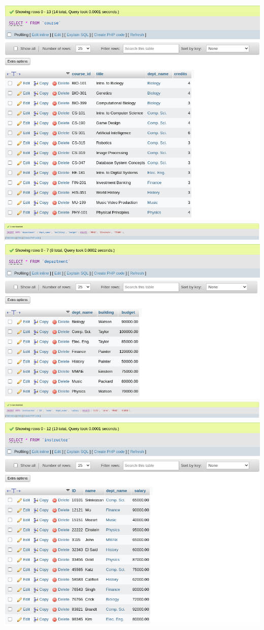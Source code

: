 \documentclass{article}
\begin{document}
\begin{center}
    \includegraphics[scale=0.5]{7-3s.png}
    \newpage
    \includegraphics[scale=0.5]{7-4i.png}
    \includegraphics[scale=0.5]{7-4s.png}
    \newpage
    \includegraphics[scale=0.5]{7-5i.png}
    \includegraphics[scale=0.5]{7-5s.png}

\end{center}
\end{document}
